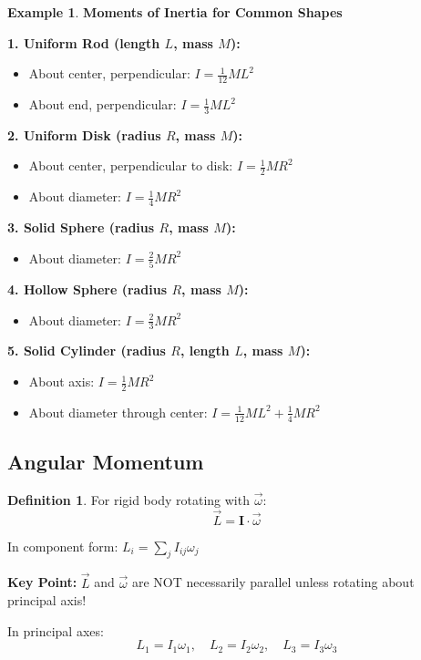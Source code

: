 \documentclass[12pt,a4paper]{article}
\theoremstyle{definition}
\newtheorem{definition}[theorem]{Definition}
\newtheorem{example}[theorem]{Example}
\begin{document}
\begin{example}
\textbf{Moments of Inertia for Common Shapes}

\textbf{1. Uniform Rod (length $L$, mass $M$):}
\begin{itemize}
    \item About center, perpendicular: $I = \frac{1}{12}ML^2$
    \item About end, perpendicular: $I = \frac{1}{3}ML^2$
\end{itemize}

\textbf{2. Uniform Disk (radius $R$, mass $M$):}
\begin{itemize}
    \item About center, perpendicular to disk: $I = \frac{1}{2}MR^2$
    \item About diameter: $I = \frac{1}{4}MR^2$
\end{itemize}

\textbf{3. Solid Sphere (radius $R$, mass $M$):}
\begin{itemize}
    \item About diameter: $I = \frac{2}{5}MR^2$
\end{itemize}

\textbf{4. Hollow Sphere (radius $R$, mass $M$):}
\begin{itemize}
    \item About diameter: $I = \frac{2}{3}MR^2$
\end{itemize}

\textbf{5. Solid Cylinder (radius $R$, length $L$, mass $M$):}
\begin{itemize}
    \item About axis: $I = \frac{1}{2}MR^2$
    \item About diameter through center: $I = \frac{1}{12}ML^2 + \frac{1}{4}MR^2$
\end{itemize}
\end{example}

\subsection{Angular Momentum}

\begin{definition}
For rigid body rotating with $\vec{\omega}$:
\[
\vec{L} = \mathbf{I} \cdot \vec{\omega}
\]

In component form: $L_i = \sum_j I_{ij}\omega_j$
\end{definition}

\begin{importantbox}
\textbf{Key Point:} $\vec{L}$ and $\vec{\omega}$ are NOT necessarily parallel unless rotating about principal axis!

In principal axes:
\[
L_1 = I_1\omega_1, \quad L_2 = I_2\omega_2, \quad L_3 = I_3\omega_3
\]
\end{importantbox}
\end{document}
